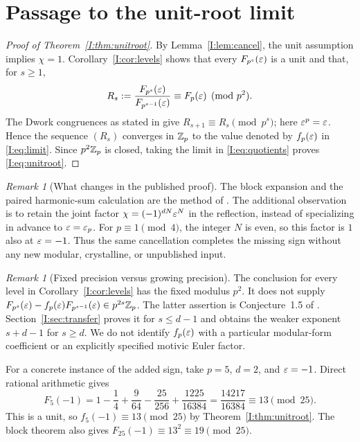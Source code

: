 \documentclass[11pt,letterpaper]{article}
\theoremstyle{definition}
\theoremstyle{remark}
\newtheorem{remark}[theorem]{Remark}
\begin{document}
\section{Passage to the unit-root limit}

\begin{proof}[Proof of Theorem~\ref{I:thm:unitroot}]
By Lemma~\ref{I:lem:cancel}, the unit assumption implies $\chi=1$.
Corollary~\ref{I:cor:levels} shows that every $F_{p^s}(\varepsilon)$ is a unit
and that, for $s\ge1$,
\begin{equation}\label{I:eq:quotients}
 R_s:=\frac{F_{p^s}(\varepsilon)}{F_{p^{s-1}}(\varepsilon)}
             \equiv F_p(\varepsilon)\pmod{p^2}.
\end{equation}
The Dwork congruences as stated in \cite[Introduction, equation (1)]{I:BD}
give $R_{s+1}\equiv R_s\pmod{p^s}$; here $\varepsilon^p=\varepsilon$.
Hence the sequence $(R_s)$ converges in $\mathbb Z_p$ to the value denoted by
$f_p(\varepsilon)$ in \eqref{I:eq:limit}.
Since $p^2\mathbb Z_p$ is closed, taking the limit in \eqref{I:eq:quotients}
proves \eqref{I:eq:unitroot}.
\end{proof}

\begin{remark}[What changes in the published proof]
The block expansion and the paired harmonic-sum calculation are the
method of \cite[Section 2]{I:BD}.  The additional observation is to retain
the joint factor $\chi=(-1)^{dN}\varepsilon^N$ in the reflection, instead of
specializing in advance to $\varepsilon=\varepsilon_p$.
For $p\equiv1\pmod4$, the integer $N$ is even, so this factor is $1$
also at $\varepsilon=-1$.  Thus the same cancellation completes the missing
sign without any new modular, crystalline, or unpublished input.
\end{remark}

\begin{remark}[Fixed precision versus growing precision]
The conclusion for every level in Corollary~\ref{I:cor:levels} has the
fixed modulus $p^2$.  It does not supply
$F_{p^s}(\varepsilon)-f_p(\varepsilon)F_{p^{s-1}}(\varepsilon)\in p^{2s}\mathbb Z_p$.
The latter assertion is Conjecture~1.5 of \cite{I:BD}.
Section~\ref{I:sec:transfer} proves it for $s\le d-1$ and obtains
the weaker exponent $s+d-1$ for $s\ge d$.
We do not identify $f_p(\varepsilon)$ with a particular modular-form
coefficient or an explicitly specified motivic Euler factor.
\end{remark}

For a concrete instance of the added sign, take $p=5$, $d=2$, and
$\varepsilon=-1$.  Direct rational arithmetic gives
\[
 F_5(-1)=1-\frac14+\frac9{64}-\frac{25}{256}
                 +\frac{1225}{16384}
          =\frac{14217}{16384}\equiv13\pmod{25}.
\]
This is a unit, so $f_5(-1)\equiv13\pmod{25}$ by
Theorem~\ref{I:thm:unitroot}.  The block theorem also gives
$F_{25}(-1)\equiv13^2\equiv19\pmod{25}$.
\end{document}
